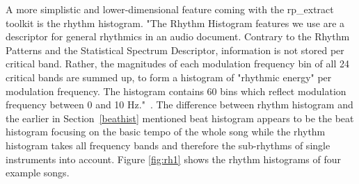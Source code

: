 A more simplistic and lower-dimensional feature coming with the rp\_extract toolkit is the rhythm histogram. "The Rhythm Histogram features we use are a descriptor for general rhythmics in an audio document. Contrary to the Rhythm Patterns and the Statistical Spectrum Descriptor, information is not stored per critical band. Rather, the magnitudes of each modulation frequency bin of all 24 critical bands are summed up, to form a histogram of "rhythmic energy" per modulation frequency. The histogram contains 60 bins which reflect modulation frequency between 0 and 10 Hz."~\cite[p. 3]{rp1}. 
The difference between rhythm histogram and the earlier in Section~\ref{beathist} mentioned beat histogram appears to be the beat histogram focusing on the basic tempo of the whole song while the rhythm histogram takes all frequency bands and therefore the sub-rhythms of single instruments into account. Figure \ref{fig:rh1} shows the rhythm histograms of four example songs. 

